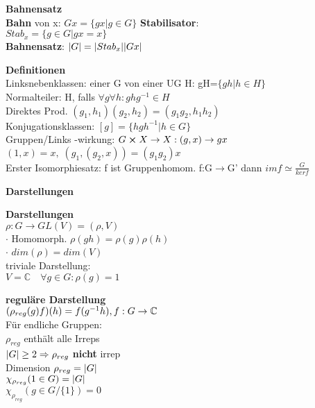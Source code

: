 \documentclass[8pt, a4paper, landscape]{extarticle}
\newcommand{\tit}[1]{\textbf{#1} \\}
\newcommand{\sh}[1]{\small\textbf{#1}}
\newcommand{\hi}[1]{\textcolor{Cerulean}{#1}}
\begin{document}
\begin{multicols*}{5}
\begin{ibox}
    \tit{Bahnensatz}
    \textbf{Bahn} von x:  $Gx=\{gx|g\in G\}$
    \textbf{Stabilisator}: \\$Stab_x=\{g\in G|gx=x\}$\\
    \textbf{Bahnensatz}: $\abs{G}=\abs{Stab_x}\abs{Gx}$
\end{ibox}
\begin{ibox}
    \tit{Definitionen}
    \hi{Linksnebenklassen:} einer G von einer UG H: gH=$\{gh|h\in H\}$\\
    \hi{Normalteiler:} H, falls $\forall g\forall h: ghg^{-1}\in H$\\  
    \hi{Direktes Prod.} $(g_1,h_1)(g_2,h_2)=(g_1g_2,h_1h_2)$\\
    \hi{Konjugationsklassen:} $[g]=\{hgh^{-1}|h\in G\}$ \\
    \hi{Gruppen/Links -wirkung:} $ G \cross X \rightarrow X: (g,x) \rightarrow gx$\\
    $(1,x) = x, \; (g_1, (g_2, x)) = (g_1 g_2) x$\\
    
\hi{Erster Isomorphiesatz:} f ist Gruppenhomom. f:G$\rightarrow$G' dann $im f \simeq \frac{G}{ker f}$
    
\end{ibox}







\begin{cbox}
    \sh{Darstellungen}
\end{cbox}
\begin{ibox}
    \tit{Darstellungen}
    $\rho: G \rightarrow GL(V) = (\rho,V)$\\
    $\cdot$ Homomorph. $\rho(gh)=\rho(g)\rho(h)$\\
    $\cdot$ $dim(\rho)=dim(V)$\\
    \hi{triviale Darstellung}:\\
    $V=\mathbb{C}\quad\forall g\in G: \rho(g)=1$\\
    
\end{ibox}

\begin{ibox}
    \tit{reguläre Darstellung}
    \textbullet $(\rho_{reg}(g)f)(h)=f(g^{-1}h),\hfill f:G\rightarrow\mathbb{C}$\\
    Für endliche Gruppen:\\
    \textbullet $\rho_{reg}$ enthält alle Irreps\\
    \textbullet $\abs{G}\geq2 \Rightarrow \rho_{reg}$ \textbf{nicht} irrep\\
    \textbullet \hi{Dimension} $\rho_{reg}=\abs{G}$\\
    \textbullet $\chi_{\rho_{reg}}(1\in G)=\abs{G}$\\
    \textbullet $\chi_{\rho_{reg}}(g\in G/\{1\})=0$
\end{ibox}



\end{multicols*}
\end{document}
